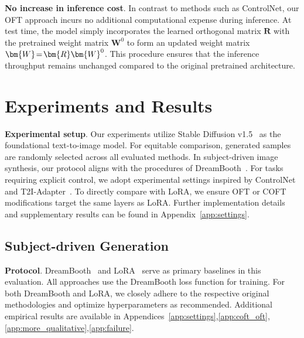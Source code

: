 \textbf{No increase in inference cost}. In contrast to methods such as ControlNet, our OFT approach incurs no additional computational expense during inference. At test time, the model simply incorporates the learned orthogonal matrix $\bm{R}$ with the pretrained weight matrix $\bm{W}^0$ to form an updated weight matrix $\thickmuskip=2mu \medmuskip=2mu \bm{W}=\bm{R}\bm{W}^0$. This procedure ensures that the inference throughput remains unchanged compared to the original pretrained architecture.

\section{Experiments and Results}

\textbf{Experimental setup}. Our experiments utilize Stable Diffusion v1.5~\cite{rombach2022high} as the foundational text-to-image model. For equitable comparison, generated samples are randomly selected across all evaluated methods. In subject-driven image synthesis, our protocol aligns with the procedures of DreamBooth~\cite{ruiz2023dreambooth}. For tasks requiring explicit control, we adopt experimental settings inspired by ControlNet~\cite{zhang2023adding} and T2I-Adapter~\cite{mou2023t2i}. To directly compare with LoRA, we ensure OFT or COFT modifications target the same layers as LoRA. Further implementation details and supplementary results can be found in Appendix~\ref{app:settings}.

\subsection{Subject-driven Generation}

\textbf{Protocol}. DreamBooth~\cite{ruiz2023dreambooth} and LoRA~\cite{hulora2022} serve as primary baselines in this evaluation. All approaches use the DreamBooth loss function for training. For both DreamBooth and LoRA, we closely adhere to the respective original methodologies and optimize hyperparameters as recommended. Additional empirical results are available in Appendices~\ref{app:settings},\ref{app:coft_oft},\ref{app:more_qualitative},\ref{app:failure}.


